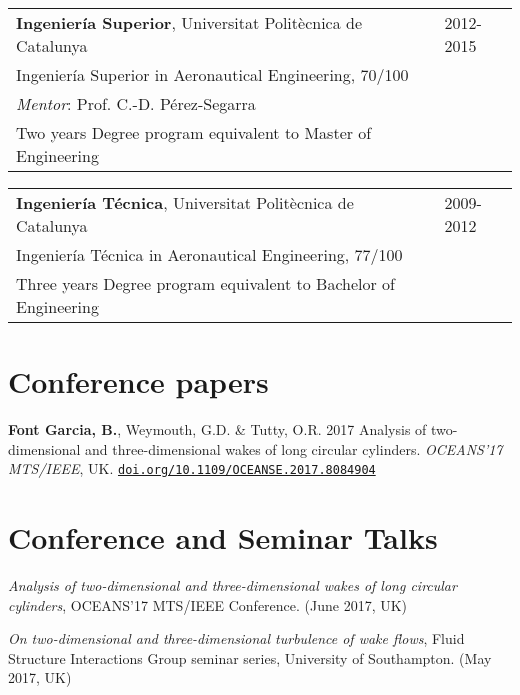 \documentclass[margin,line,pifont,palatino,courier]{res}
\begin{document}
\begin{resume}
\begin{tabular}{@{}p{0.85\linewidth}p{0.15\linewidth}}
\textbf{Ingenier\'{i}a Superior}, Universitat Polit\`{e}cnica de Catalunya & 2012-2015\\ 
\hspace*{1em}Ingenier\'{i}a Superior in Aeronautical Engineering, 70/100 &\\
\hspace*{1em}\textit{Mentor}: Prof. C.-D. P\'{e}rez-Segarra&\\
\hspace*{1em}Two years Degree program equivalent to Master of Engineering
\end{tabular}

\begin{tabular}{@{}p{0.85\linewidth}p{0.15\linewidth}}
\textbf{Ingenier\'{i}a T\'{e}cnica}, Universitat Polit\`{e}cnica de Catalunya & 2009-2012\\ 
\hspace*{1em}Ingenier\'{i}a T\'{e}cnica in Aeronautical Engineering, 77/100 &\\
\hspace*{1em}Three years Degree program equivalent to Bachelor of Engineering
\end{tabular}

\section{\sc Conference papers}
\textbf{Font Garcia, B.}, Weymouth, G.D. \& Tutty, O.R. 2017 Analysis of two-dimensional and three-dimensional wakes of long circular cylinders. {\em OCEANS'17 MTS/IEEE}, UK. \href{https://doi.org/10.1109/OCEANSE.2017.8084904}{\texttt{doi.org/10.1109/OCEANSE.2017.8084904}}\\


\section{\sc Conference and Seminar Talks}
\emph{Analysis of two-dimensional and three-dimensional 
wakes of long circular cylinders}, OCEANS'17 MTS/IEEE Conference. (June 2017, UK)

\emph{On two-dimensional and three-dimensional turbulence of wake flows}, Fluid Structure Interactions Group seminar series, University of Southampton. (May 2017, UK)


\end{resume}
\end{document}
